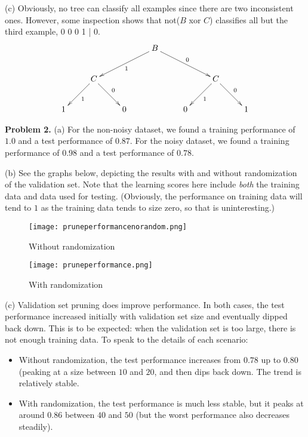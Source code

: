 \documentclass[12pt]{amsart}
\theoremstyle{remark}
\begin{document}
(c) Obviously, no tree can classify all examples since there are two inconsistent ones. However, some inspection shows that not($B$ xor $C$) classifies all but the third example, 0 0 0 1 | 0. 
\[
\xymatrix{
& & & \ar[dll]^1 \ar[drr]^0 B  & & & \\
& C \ar[dl]^1 \ar[dr]^0 & & & & C \ar[dl]^1 \ar[dr]^0 \\
1 & & 0 & & 0 &  & 1
}
\]

\newpage

\noindent \textbf{Problem 2.} (a) For the non-noisy dataset, we found a training performance of $1.0$ and a test performance of $0.87$. For the noisy dataset, we found a training performance of $0.98$ and a test performance of $0.78$. 

(b) See the graphs below, depicting the results with and without randomization of the validation set. Note that the learning scores here include \emph{both} the training data and data used for testing. (Obviously, the performance on training data will tend to $1$ as the training data tends to size zero, so that is uninteresting.) 


\begin{figure}[!h]
\texttt{[image: pruneperformancenorandom.png]}
\caption{Without randomization}
\end{figure}

\begin{figure}[!h]
\texttt{[image: pruneperformance.png]}
\caption{With randomization}
\end{figure}



(c) Validation set pruning does improve performance. In both cases, the test performance increased initially with validation set size and eventually dipped back down. This is to be expected: when the validation set is too large, there is not enough training data. To speak to the details of each scenario:

\begin{itemize}
\item Without randomization, the test performance increases from $0.78$ up to $0.80$ (peaking at a size between $10$ and $20$, and then dips back down. The trend is relatively stable. 
\item With randomization, the test performance is much less stable, but it peaks at around $0.86$ between $40$ and $50$ (but the worst performance also decreases steadily). 
\end{itemize}
\end{document}
